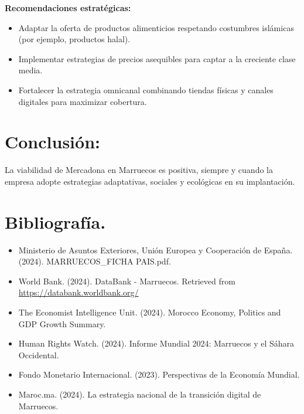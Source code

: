 \documentclass{article}  %
\begin{document}
\textbf{Recomendaciones estratégicas:}


\begin{itemize}
\item
  Adaptar la oferta de productos alimenticios respetando costumbres
  islámicas (por ejemplo, productos halal).
\item
  Implementar estrategias de precios asequibles para captar a la
  creciente clase media.
\item
  Fortalecer la estrategia omnicanal combinando tiendas físicas y
  canales digitales para maximizar cobertura.
\end{itemize}



\section{Conclusión:}\label{conclusiuxf3n}

La viabilidad de Mercadona en Marruecos es positiva, siempre y cuando la
empresa adopte estrategias adaptativas, sociales y ecológicas en su
implantación.

\section{Bibliografía.}\label{bibliografuxeda.}


\begin{itemize}
\item
  Ministerio de Asuntos Exteriores, Unión Europea y Cooperación de
  España. (2024). MARRUECOS\_FICHA PAIS.pdf.
\item
  World Bank. (2024). DataBank - Marruecos. Retrieved from
  \url{https://databank.worldbank.org/}
\item
  The Economist Intelligence Unit. (2024). Morocco Economy, Politics and
  GDP Growth Summary.
\item
  Human Rights Watch. (2024). Informe Mundial 2024: Marruecos y el
  Sáhara Occidental.
\item
  Fondo Monetario Internacional. (2023). Perspectivas de la Economía
  Mundial.
\item
  Maroc.ma. (2024). La estrategia nacional de la transición digital de
  Marruecos.
\end{itemize}
\end{document}
